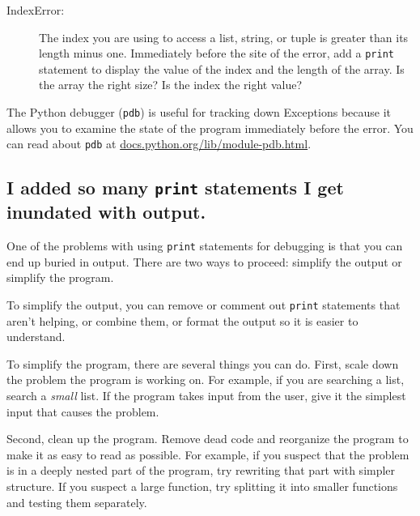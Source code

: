 \documentclass[10pt]{book}
\begin{document}
\begin{description}

\item[IndexError:] The index you are using
to access a list, string, or tuple is greater than
its length minus one.  Immediately before the site of the error,
add a {\tt print} statement to display
the value of the index and the length of the array.
Is the array the right size?  Is the index the right value?


\end{description}


The Python debugger ({\tt pdb}) is useful for tracking down
Exceptions because it allows you to examine the state of the
program immediately before the error.  You can read
about {\tt pdb} at \url{docs.python.org/lib/module-pdb.html}.


\subsection{I added so many {\tt print} statements I get inundated with
output.}


One of the problems with using {\tt print} statements for debugging
is that you can end up buried in output.  There are two ways
to proceed: simplify the output or simplify the program.

To simplify the output, you can remove or comment out {\tt print}
statements that aren't helping, or combine them, or format
the output so it is easier to understand.

To simplify the program, there are several things you can do.  First,
scale down the problem the program is working on.  For example, if you
are searching a list, search a {\em small} list.  If the program takes
input from the user, give it the simplest input that causes the
problem.


Second, clean up the program.  Remove dead code and reorganize the
program to make it as easy to read as possible.  For example, if you
suspect that the problem is in a deeply nested part of the program,
try rewriting that part with simpler structure.  If you suspect a
large function, try splitting it into smaller functions and testing them
separately.
\end{document}
